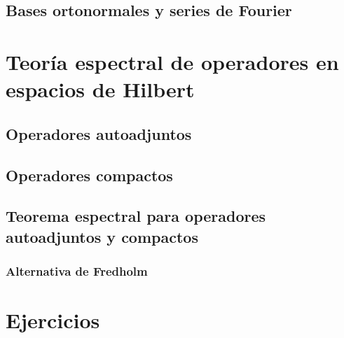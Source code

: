 \documentclass[palatino]{apuntes}
\begin{document}
\section{Bases ortonormales y series de Fourier}

\chapter{Teoría espectral de operadores en espacios de Hilbert}

\section{Operadores autoadjuntos}

\section{Operadores compactos}

\section{Teorema espectral para operadores autoadjuntos y compactos}

\subsection{Alternativa de Fredholm}

\appendix

\chapter{Ejercicios}


\nocite{brezis2010functional,reed1980methods,rudin1991functional,ApuntesVarReal}
{}

\printindex
\end{document}
